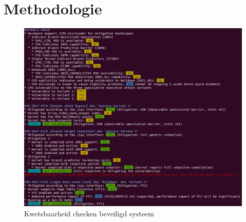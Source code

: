 
\chapter{Methodologie}
\label{ch:methodologie}



\begin{figure}
	\includegraphics[width=1.0\linewidth]{img/checker_patched.png}
	\caption{Kwetsbaarheid checken beveiligd systeem}
	\label{fig:checker_patched}
\end{figure}

